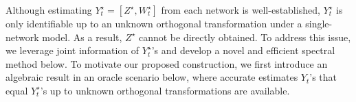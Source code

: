 \documentclass[12pt]{article}
\begin{document}
Although estimating $Y_t^{\star}=[Z^\star, W_t^\star]$ from each network  is well-established, 
$Y_t^{\star}$ is only identifiable up to an unknown orthogonal transformation under a single-network model. As a result, $Z^{\star}$ cannot be directly obtained. 
To address this issue, we leverage joint information of  $Y_t^{\star}$'s and  develop a novel and efficient  spectral method below. 
To motivate our proposed construction, 
we first introduce an algebraic result in an oracle scenario below, where accurate estimates $Y_t$'s that equal  $Y_t^{\star}$'s up to unknown orthogonal transformations are available.  
\end{document}
